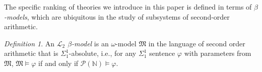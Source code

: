 \documentclass{amsart}
\theoremstyle{remark}
\newtheorem{remark}[remark]{Remark}
\newtheorem{definition}[definition]{Definition}
\newcommand{\PRS}{\mathsf{PRS}}
\newcommand{\ATR}{\mathsf{ATR}}
\newcommand{\KP}{\mathsf{KP}}
\newcommand{\set}{\mathsf{set}}
\begin{document}

The specific ranking of theories we introduce in this paper is defined in terms of \emph{$\beta$-models}, which are ubiquitous in the study of subsystems of second-order arithmetic.


\begin{definition}
An \emph{$\mathcal{L}_2$ $\beta$-model} is an $\omega$-model $\mathfrak{M}$ in the language of second order arithmetic that is $\Sigma^1_1$-absolute, i.e., for any $\Sigma^1_1$ sentence $\varphi$ with parameters from $\mathfrak{M}$, $\mathfrak{M}\vDash\varphi$ if and only if $\mathcal{P}(\mathbb{N})\vDash\varphi$.
\end{definition}




\end{document}
